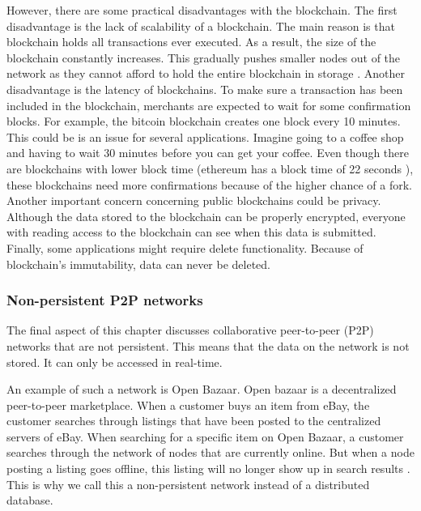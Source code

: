 However, there are some practical disadvantages with the blockchain. The first disadvantage is the lack of scalability of a blockchain. The main reason is that blockchain holds all transactions ever executed. As a result, the size of the blockchain constantly increases. This gradually pushes smaller nodes out of the network as they cannot afford to hold the entire blockchain in storage \cite{blockchain-scalability}. Another disadvantage is the latency of blockchains. To make sure a transaction has been included in the blockchain, merchants are expected to wait for some confirmation blocks. For example, the bitcoin blockchain creates one block every 10 minutes. This could be is an issue for several applications. Imagine going to a coffee shop and having to wait 30 minutes before you can get your coffee. Even though there are blockchains with lower block time (ethereum has a block time of 22 seconds \cite{ethereum-block-time}), these blockchains need more confirmations because of the higher chance of a fork. Another important concern concerning public blockchains could be privacy. Although the data stored to the blockchain can be properly encrypted, everyone with reading access to the blockchain can see when this data is submitted. Finally, some applications might require delete functionality. Because of blockchain's immutability, data can never be deleted.

\subsubsection{Non-persistent P2P networks}

The final aspect of this chapter discusses collaborative peer-to-peer (P2P) networks that are not persistent. This means that the data on the network is not stored. It can only be accessed in real-time. 

An example of such a network is Open Bazaar. Open bazaar is a decentralized peer-to-peer marketplace. When a customer buys an item from eBay, the customer searches through listings that have been posted to the centralized servers of eBay. When searching for a specific item on Open Bazaar, a customer searches through the network of nodes that are currently online. But when a node posting a listing goes offline, this listing will no longer show up in search results \cite{openbazaar-faq}. This is why we call this a non-persistent network instead of a distributed database.

